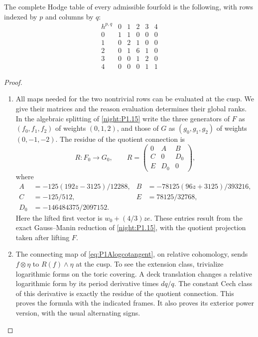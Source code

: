 



\begin{theorem}\hypertarget{tag-02R2}{}\label{night:P1A.2}
The complete Hodge table of every admissible fourfold is the
following, with rows indexed by $p$ and columns by $q$:
\[
\begin{array}{c|ccccc}
h^{p,q}&0&1&2&3&4\\\hline
0&1&1&0&0&0\\
1&0&2&1&0&0\\
2&0&1&6&1&0\\
3&0&0&1&2&0\\
4&0&0&0&1&1
\end{array}
\]
\end{theorem}
\begin{proof}
\begin{enumerate}[label={$\langle1\rangle$\arabic*.}]
\item All maps needed for the two nontrivial rows can be evaluated at
the cusp. We give their matrices and the reason evaluation
determines their global ranks. In the algebraic splitting of
\cref{night:P1.15} write the three generators of $F$ as $(f_0,f_1,f_2)$ of
weights $(0,1,2)$, and those of $G$ as $(g_0,g_1,g_2)$ of
weights $(0,-1,-2)$. The residue of the quotient connection is
\[
R:F_0\longrightarrow G_0,\qquad
R=\begin{pmatrix}0&A&B\\C&0&D_0\\E&D_0&0\end{pmatrix},
\]
where
\begin{align*}
A&=-125(192z-3125)/12288,&
B&=-78125(96z+3125)/393216,\\
C&=-125/512,&E&=78125/32768,\\
D_0&=-146484375/2097152.
\end{align*}
Here the lifted first vector is $w_0+(4/3)ze$.
These entries result from the exact Gauss--Manin reduction of
\cref{night:P1.15}, with the quotient projection taken after lifting $F$.

\item The connecting map of \eqref{eq:P1Alogcotangent}, on relative
cohomology, sends $f\otimes\eta$ to $R(f)\wedge\eta$ at the
cusp. To see the extension class, trivialize logarithmic
forms on the toric covering. A deck translation changes a
relative logarithmic form by its period derivative times
$dq/q$. The constant Cech class of this derivative is exactly
the residue of the quotient connection. This proves the
formula with the indicated frames. It also proves its exterior
power version, with the usual alternating signs.


\end{enumerate}
\end{proof}
